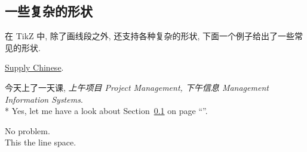 \documentclass[12pt,a4paper,twoside,UTF8]{ctexart}
\begin{document}
    \subsection{一些复杂的形状} \label{this}
    在 TikZ 中, 除了画线段之外, 还支持各种复杂的形状, 下面一个例子给出了一些常见的形状.


    \underline{Supply Chinese}.
    
    今天上了一天课, \emph{上午项目 Project Management, 下午信息 Management Information Systems}.
    \\*
    Yes, let me have a look about Section~\ref{this} on page ``\pageref{this}''.

    No problem.\\[20mm]
    
    This the line space.
\end{document}
